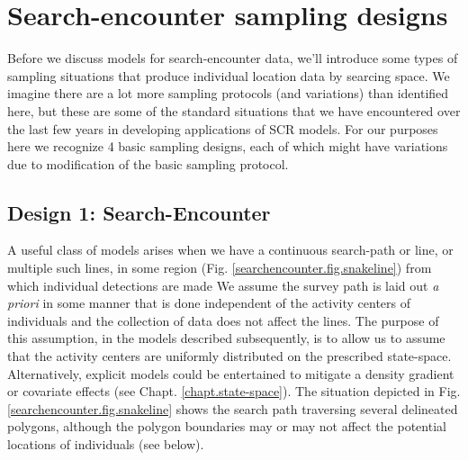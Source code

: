 \section{Search-encounter sampling designs}

Before we discuss models for search-encounter data, we'll introduce some
types of sampling situations that produce individual location data
by searcing space.  We imagine there are a lot more sampling protocols
(and variations) than identified here, but these are some of the
standard situations that we have encountered over the last few years
in developing applications of SCR models.  For our purposes here we
recognize 4 basic sampling designs, each of which might have
variations due to modification of the basic sampling protocol.


\subsection{Design 1: Search-Encounter}
\label{searchencounter.sec.fixedpath}

A useful class of models arises when we have a continuous search-path
or line, or multiple such lines, in some region
(Fig. \ref{searchencounter.fig.snakeline}) from which individual
detections are made We assume the survey path is laid out {\it a
  priori} in some manner that is done independent of the activity
centers of individuals and the collection of data does not affect the
lines.  The purpose of this assumption, in the models described
subsequently, is to allow us to assume that the activity centers are
uniformly distributed on the prescribed state-space. Alternatively,
explicit models could be entertained to mitigate a density gradient or
covariate effects (see Chapt. \ref{chapt.state-space}). The situation
depicted in Fig. \ref{searchencounter.fig.snakeline} shows the search
path traversing several delineated polygons, although the polygon
boundaries may or may not affect the potential locations of
individuals (see below).

